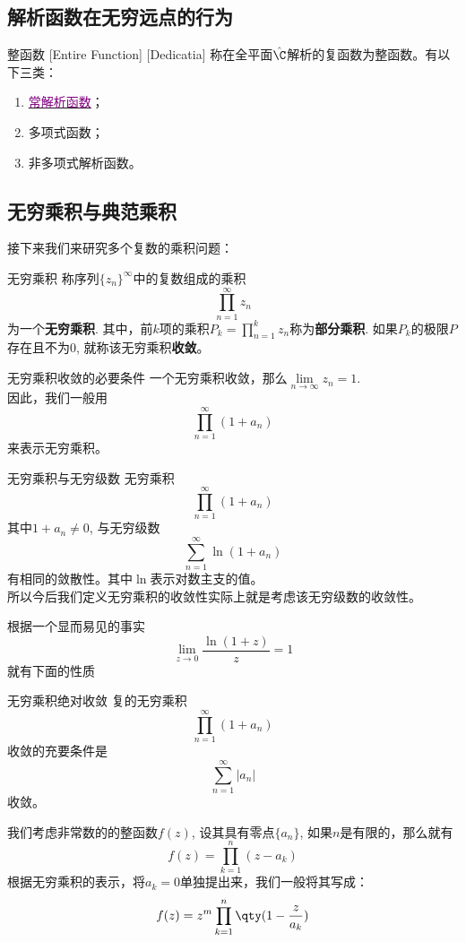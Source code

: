 \documentclass[UTF8]{ctexart}
\newcommand{\hyperrefc}[2]{\hyperref[#1]{\textcolor{purple}{#2}}}
\begin{document}
\subsection{解析函数在无穷远点的行为}
\begin{dfn}
    [EntireFunction]
    {整函数}
    [Entire Function]
    [Dedicatia]
    称在全平面$\hat{\C}$解析的复函数为整函数。有以下三类：
    \begin{enumerate}
        \item \hyperrefc{ppt:TrivialAnalyticalFunction}{常解析函数}；
        \item 多项式函数；
        \item 非多项式解析函数。
    \end{enumerate}
\end{dfn}
\subsection{无穷乘积与典范乘积}
接下来我们来研究多个复数的乘积问题：
\begin{dfn}
    {无穷乘积}
    称序列$\{z_n\}^\infty$中的复数组成的乘积
    \[\prod_{n=1}^{\infty}z_n\]
    为一个\textbf{无穷乘积}. 其中，前$k$项的乘积$P_k=\prod\limits_{n=1}^{k}z_n$称为\textbf{部分乘积}. 如果$P_k$的极限$P$存在且不为0, 就称该无穷乘积\textbf{收敛}。
\end{dfn}
\begin{ppt}
    {无穷乘积收敛的必要条件}
    一个无穷乘积收敛，那么$\lim\limits_{n\to\infty}z_n=1$.\\
    因此，我们一般用
    \[\prod_{n=1}^{\infty}(1+a_n)\]
    来表示无穷乘积。
\end{ppt}
\begin{ppt}
    {无穷乘积与无穷级数}
    无穷乘积
    \[\prod_{n=1}^{\infty}(1+a_n)\]
    其中$1+a_n\neq 0$, 与无穷级数
    \[\sum_{n=1}^\infty\ln(1+a_n)\]
    有相同的敛散性。其中$\ln$表示对数主支的值。\\
    所以今后我们定义无穷乘积的收敛性实际上就是考虑该无穷级数的收敛性。
\end{ppt}
根据一个显而易见的事实
\[\lim_{z\to 0}\frac{\ln(1+z)}{z}=1\]
就有下面的性质
\begin{ppt}
    {无穷乘积绝对收敛}
    复的无穷乘积
    \[\prod_{n=1}^{\infty}(1+a_n)\]
    收敛的充要条件是
    \[\sum_{n=1}^\infty|a_n|\]
    收敛。
\end{ppt}
我们考虑非常数的的整函数$f(z)$, 设其具有零点$\{a_n\}$, 如果$n$是有限的，那么就有
\[f(z)=\prod_{k=1}^{n}(z-a_k)\]
根据无穷乘积的表示，将$a_k=0$单独提出来，我们一般将其写成：
\[f(z)=z^m\prod_{k=1}^{n}\qty(1-\frac{z}{a_k})\]
\end{document}

